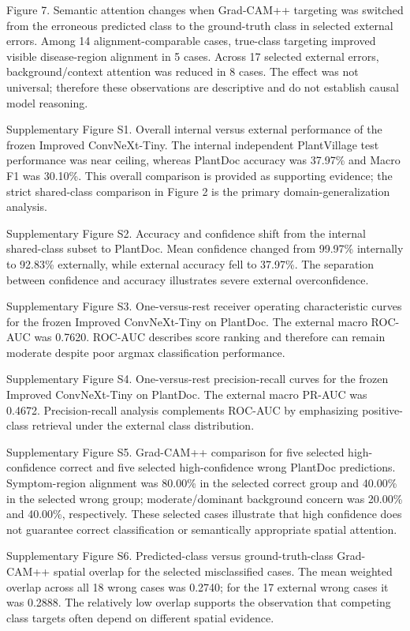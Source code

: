 \caption{Figure 7. Semantic attention changes when Grad-CAM++ targeting was switched from the erroneous predicted class to the ground-truth class in selected external errors. Among 14 alignment-comparable cases, true-class targeting improved visible disease-region alignment in 5 cases. Across 17 selected external errors, background/context attention was reduced in 8 cases. The effect was not universal; therefore these observations are descriptive and do not establish causal model reasoning.}

\caption{Supplementary Figure S1. Overall internal versus external performance of the frozen Improved ConvNeXt-Tiny. The internal independent PlantVillage test performance was near ceiling, whereas PlantDoc accuracy was 37.97\% and Macro F1 was 30.10\%. This overall comparison is provided as supporting evidence; the strict shared-class comparison in Figure 2 is the primary domain-generalization analysis.}

\caption{Supplementary Figure S2. Accuracy and confidence shift from the internal shared-class subset to PlantDoc. Mean confidence changed from 99.97\% internally to 92.83\% externally, while external accuracy fell to 37.97\%. The separation between confidence and accuracy illustrates severe external overconfidence.}

\caption{Supplementary Figure S3. One-versus-rest receiver operating characteristic curves for the frozen Improved ConvNeXt-Tiny on PlantDoc. The external macro ROC-AUC was 0.7620. ROC-AUC describes score ranking and therefore can remain moderate despite poor argmax classification performance.}

\caption{Supplementary Figure S4. One-versus-rest precision-recall curves for the frozen Improved ConvNeXt-Tiny on PlantDoc. The external macro PR-AUC was 0.4672. Precision-recall analysis complements ROC-AUC by emphasizing positive-class retrieval under the external class distribution.}

\caption{Supplementary Figure S5. Grad-CAM++ comparison for five selected high-confidence correct and five selected high-confidence wrong PlantDoc predictions. Symptom-region alignment was 80.00\% in the selected correct group and 40.00\% in the selected wrong group; moderate/dominant background concern was 20.00\% and 40.00\%, respectively. These selected cases illustrate that high confidence does not guarantee correct classification or semantically appropriate spatial attention.}

\caption{Supplementary Figure S6. Predicted-class versus ground-truth-class Grad-CAM++ spatial overlap for the selected misclassified cases. The mean weighted overlap across all 18 wrong cases was 0.2740; for the 17 external wrong cases it was 0.2888. The relatively low overlap supports the observation that competing class targets often depend on different spatial evidence.}

